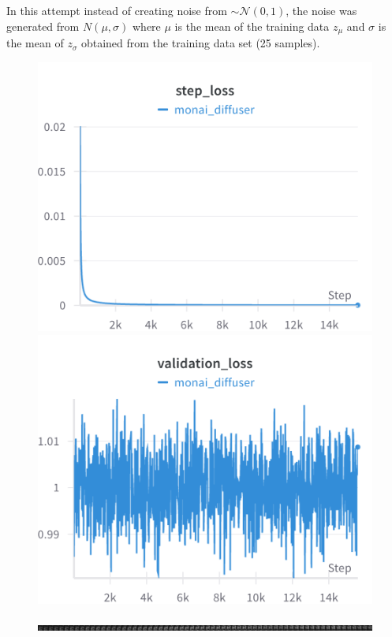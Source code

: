 

In this attempt instead of creating noise from $\sim\mathcal{N}(0,1)$, the noise was generated from $N(\mu, \sigma)$ where $\mu$ is the mean of the training data $z_{\mu}$ and $\sigma$ is the mean of $z_{\sigma}$ obtained from the training data set (25 samples).

\begin{figure}[H]
\includegraphics[width=\linewidth]{detailed_engineering/Monai Diffusion - Attempt 2/charts/step_loss.png}
\caption{}
\endminipage\hfill
{}
\includegraphics[width=\linewidth]{detailed_engineering/Monai Diffusion - Attempt 2/charts/val_loss.png}
\caption{}
\endminipage
\end{figure}

\begin{figure}[H]
\includegraphics[width=\linewidth]{detailed_engineering/Monai Diffusion - Attempt 2/charts/generation.png}
\caption{}
\end{figure}
